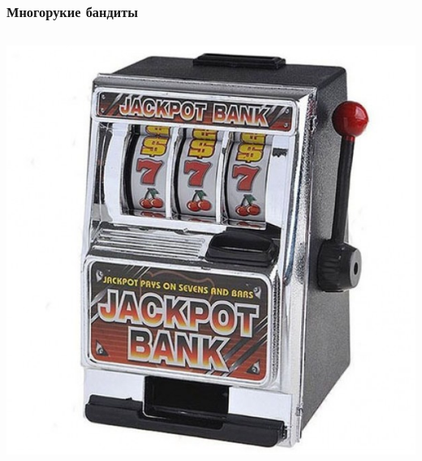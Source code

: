 \documentclass[fullscreen=true, bookmarks=true, hyperref={pdfencoding=unicode}]{beamer}
\begin{document}
\begin{frame}
  \frametitle{Многорукие бандиты}

  \begin{columns}
      \begin{column}{.25\paperwidth}
        \begin{center}
          \includegraphics[keepaspectratio,
                           width=.2\paperwidth]{data-kopilkabandit.jpg}


\end{center}
\end{column}
\end{columns}
\end{frame}
\end{document}
